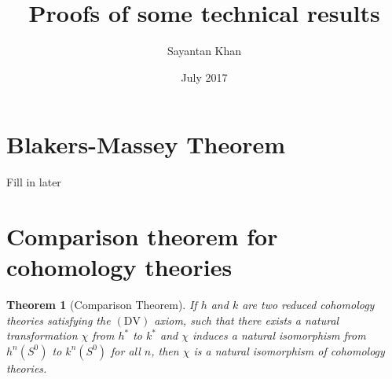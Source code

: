 \documentclass[12pt, notitlepage]{article}
\title{Proofs of some technical results}
\author{Sayantan Khan}
\date{July 2017}
\newtheorem{thm}{Theorem}[section]
\theoremstyle{definition}
\begin{document}
\maketitle

\tableofcontents


\newpage

\section{Blakers-Massey Theorem}
\label{sec:blak-mass-theor}

Fill in later

\section{Comparison theorem for cohomology theories}
\label{sec:comp-theor-cohom}

\begin{thm}[Comparison Theorem]
  If $h$ and $k$ are two reduced cohomology theories satisfying the $(\mathrm{DV})$ axiom, such that
  there exists a natural transformation $\chi$ from $h^{\ast}$ to $k^{\ast}$ and $\chi$ induces a
  natural isomorphism from $h^n(S^0)$ to $k^n(S^0)$ for all $n$, then $\chi$ is a natural
  isomorphism of cohomology theories.
\end{thm}
\end{document}
